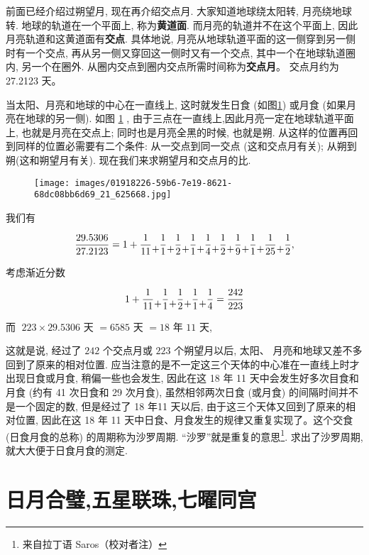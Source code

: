 \documentclass{ctexart}
\newcommand{\cplus}{\raisebox{-1ex}{+}}
\begin{document}
前面已经介绍过朔望月, 现在再介绍交点月. 大家知道地球绕太阳转, 月亮绕地球转. 地球的轨道在一个平面上, 称为\textbf{黄道面}. 而月亮的轨道并不在这个平面上, 因此月亮轨道和这黄道面有\textbf{交点}. 具体地说, 月亮从地球轨道平面的这一侧穿到另一侧时有一个交点, 再从另一侧又穿回这一侧时又有一个交点, 其中一个在地球轨道圈内, 另一个在圈外. 从圈内交点到圈内交点所需时间称为\textbf{交点月}。 交点月约为 27.2123 天。

当太阳、月亮和地球的中心在一直线上, 这时就发生日食 (如图\ref{fig:1}) 或月食 (如果月亮在地球的另一侧). 如图 \ref{fig:1} , 由于三点在一直线上,因此月亮一定在地球轨道平面上, 也就是月亮在交点上; 同时也是月亮全黑的时候, 也就是朔. 从这样的位置再回到同样的位置必需要有二个条件: 从一交点到同一交点 (这和交点月有关); 从朔到朔(这和朔望月有关). 现在我们来求朔望月和交点月的比.


\begin{figure}[th]
\begin{center}
  \texttt{[image: images/01918226-59b6-7e19-8621-68dc08bb6d69\_21\_625668.jpg]}
  \caption{\label{fig:1}}
\end{center}
\end{figure}

我们有

\[
\frac{29.5306}{27.2123} = 1 + \frac{1}{11} \cplus \frac{1}{1}  \cplus \frac{1}{2}  \cplus \frac{1}{1}  \cplus \frac{1}{4}  \cplus \frac{1}{2}  \cplus \frac{1}{9}  \cplus \frac{1}{1}  \cplus \frac{1}{25}  \cplus \frac{1}{2},
\]

考虑渐近分数

\[
1 + \frac{1}{11}  \cplus \frac{1}{1}  \cplus \frac{1}{2}  \cplus \frac{1}{1}  \cplus \frac{1}{4} = \frac{242}{223}
\]

而 \(\;{223} \times {29.5306}\) 天 \(= {6585}\) 天 \(= {18}\) 年 \(11\) 天,

这就是说, 经过了 \(242\) 个交点月或 $223$ 个朔望月以后, 太阳、 月亮和地球又差不多回到了原来的相对位置. 应当注意的是不一定这三个天体的中心准在一直线上时才出现日食或月食, 稍偏一些也会发生, 因此在这 18 年 11 天中会发生好多次目食和月食 (约有 41 次日食和 29 次月食), 虽然相邻两次日食 (或月食) 的间隔时间并不是一个固定的数, 但是经过了 18 年11 天以后, 由于这三个天体又回到了原来的相对位置, 因此在这 18 年 11 天中日食、月食发生的规律又重复实现了。这个交食 (日食月食的总称) 的周期称为沙罗周期. “沙罗”就是重复的意思\footnote{来自拉丁语 Saros（校对者注）}. 求出了沙罗周期, 就大大便于日食月食的测定.

\section{日月合璧,五星联珠,七曜同宫}
\end{document}
